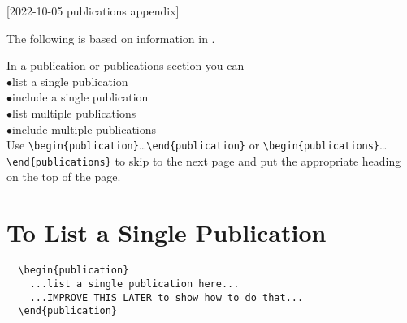 [2022-10-05 publications appendix]

\index{\verb+\begin{publications}+}
    
The following is based on information in
\cite{template1,template2,template3}.

\renewcommand{\I}{\hspace*{2\ZZparindent}$\bullet$\hspace*{1.5em}}

In a publication or publications section you can\\
  \I list a single publication\\
  \I include a single publication\\
  \I list multiple publications\\
  \I include multiple publications\\
Use\newline
\hspace*{0.5in}\verb+\begin{publication}+\ldots\verb+\end{publication}+\newline
or\newline
\hspace*{0.5in}\verb+\begin{publications}+\ldots\verb+\end{publications}+\newline
to skip to the next page and put the appropriate heading on the
top of the page.

\vspace*{1.5\baselineskip}

\section*{To List a Single Publication}

\begin{verbatim}
  \begin{publication}
    ...list a single publication here...
    ...IMPROVE THIS LATER to show how to do that...
  \end{publication}
\end{verbatim}


